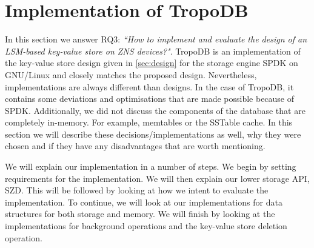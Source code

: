 \chapter{Implementation of TropoDB}
\label{sec:implementation}
In this section we answer RQ3: \textit{``How to implement and evaluate the design of an LSM-based key-value store on ZNS devices?"}.
TropoDB is an implementation of the key-value store design given in \autoref{sec:design} for the storage engine SPDK on GNU/Linux and closely matches the proposed design. Nevertheless, implementations are always different than designs. In the case of TropoDB, it contains some deviations and optimisations that are made possible because of SPDK. Additionally, we did not discuss the components of the database that are completely in-memory. For example, memtables or the SSTable cache. In this section we will describe these decisions/implementations as well, why they were chosen and if they have any disadvantages that are worth mentioning. 

We will explain our implementation in a number of steps. We begin by setting requirements for the implementation. We will then explain our lower storage API, SZD. This will be followed by looking at how we intent to evaluate the implementation. To continue, we will look at our implementations for data structures for both storage and memory. We will finish by looking at the implementations for background operations and the key-value store deletion operation.

